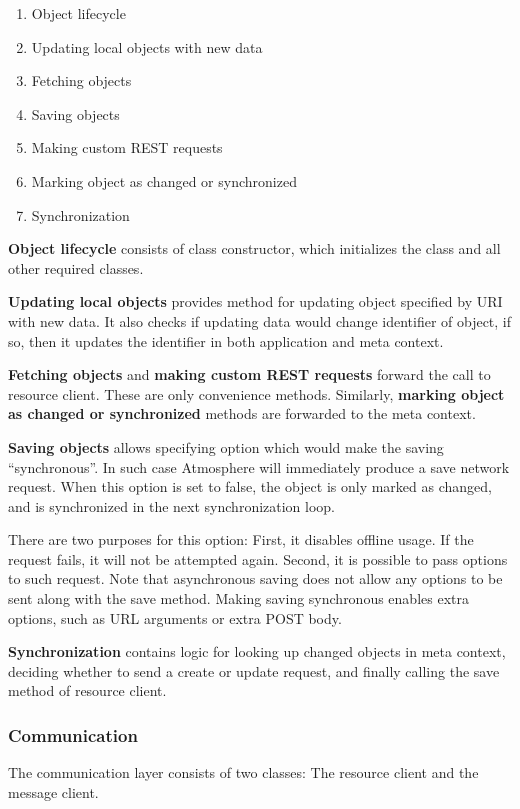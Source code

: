 \begin{enumerate}
\item Object lifecycle
\item Updating local objects with new data
\item Fetching objects
\item Saving objects
\item Making custom REST requests
\item Marking object as changed or synchronized
\item Synchronization
\end{enumerate}

\textbf{Object lifecycle} consists of class constructor, which initializes the class and all other required classes.

\textbf{Updating local objects} provides method for updating object specified by URI with new data. It also checks if updating data would change identifier of object, if so, then it updates the identifier in both application and meta context.

\textbf{Fetching objects} and \textbf{making custom REST requests} forward the call to resource client. These are only convenience methods. Similarly, \textbf{marking object as changed or synchronized} methods are forwarded to the meta context.

\textbf{Saving objects} allows specifying option which would make the saving ``synchronous''. In such case Atmosphere will immediately produce a save network request. When this option is set to false, the object is only marked as changed, and is synchronized in the next synchronization loop.

There are two purposes for this option: First, it disables offline usage. If the request fails, it will not be attempted again. Second, it is possible to pass options to such request. Note that asynchronous saving does not allow any options to be sent along with the save method. Making saving synchronous enables extra options, such as URL arguments or extra POST body.

\textbf{Synchronization} contains logic for looking up changed objects in meta context, deciding whether to send a create or update request, and finally calling the save method of resource client.

\subsubsection{Communication}

The communication layer consists of two classes: The resource client and the message client.

